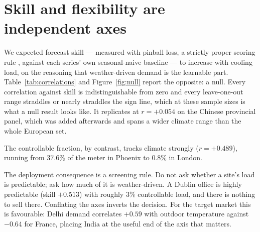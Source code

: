 \section{Skill and flexibility are independent axes}
\label{sec:axes}




We expected forecast skill --- measured with pinball loss, a strictly proper
scoring rule \citep{gneiting2007strictly}, against each series' own
seasonal-naive baseline --- to increase with cooling load, on the reasoning that
weather-driven demand is the learnable part. Table~\ref{tab:correlations} and
Figure~\ref{fig:null} report the opposite: a null. Every correlation against
skill is indistinguishable from zero and every leave-one-out range straddles or
nearly straddles the sign line, which at these sample sizes is what a null
result looks like. It replicates at $r=+0.054$ on the Chinese provincial panel,
which was added afterwards and spans a wider climate range than the whole
European set.

The controllable fraction, by contrast, tracks climate strongly ($r=+0.489$),
running from $37.6\%$ of the meter in Phoenix to $0.8\%$ in London.

The deployment consequence is a screening rule. Do not ask whether a site's load
is predictable; ask how much of it is weather-driven. A Dublin office is highly
predictable (skill $+0.513$) with roughly $3\%$ controllable load, and there is
nothing to sell there. Conflating the axes inverts the decision. For the target
market this is favourable: Delhi demand correlates $+0.59$ with outdoor
temperature against $-0.64$ for France, placing India at the useful end of the
axis that matters.
